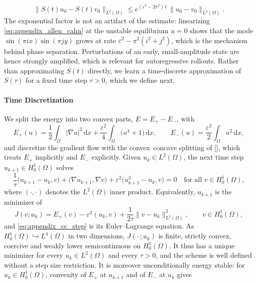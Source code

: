 \documentclass{article} %
\begin{document}
\begin{equation}\label{eq:appendix_ac_stability}
   \|S(t)u_0 - S(t)v_0\|_{L^2(\Omega)} \leq e^{(\varepsilon^2 - 2\pi^2)\,t}\,\|u_0 - v_0\|_{L^2(\Omega)}.
\end{equation}
The exponential factor is not an artifact of the estimate: linearizing \eqref{eq:appendix_allen_cahn} at the unstable equilibrium $u = 0$ shows that the mode $\sin(\pi i x)\sin(\pi j y)$ grows at rate $\varepsilon^2 - \pi^2(i^2 + j^2)$, which is the mechanism behind phase separation. Perturbations of an early, small-amplitude state are hence strongly amplified, which is relevant for autoregressive rollouts. Rather than approximating $S(t)$ directly, we learn a time-discrete approximation of $S(\tau)$ for a fixed time step $\tau > 0$, which we define next.

\paragraph{Time Discretization} We split the energy into two convex parts, $E = E_+ - E_-$, with
\begin{equation*}
   E_+(u) = \frac12\int_\Omega |\nabla u|^2\,\mathrm dx + \frac{\varepsilon^2}{4}\int_\Omega \big(u^4 + 1\big)\,\mathrm dx,
   \qquad
   E_-(u) = \frac{\varepsilon^2}{2}\int_\Omega u^2\,\mathrm dx,
\end{equation*}
and discretize the gradient flow with the convex--concave splitting of [], which treats $E_+$ implicitly and $E_-$ explicitly. Given $u_k \in L^2(\Omega)$, the next time step $u_{k+1}\in H^1_0(\Omega)$ solves
\begin{equation}\label{eq:appendix_cc_step}
   \frac1\tau\big(u_{k+1} - u_k, v\big) + \big(\nabla u_{k+1}, \nabla v\big) + \varepsilon^2\big(u_{k+1}^3 - u_k, v\big) = 0
   \quad \text{for all } v\in H^1_0(\Omega),
\end{equation}
where $(\cdot,\cdot)$ denotes the $L^2(\Omega)$ inner product. Equivalently, $u_{k+1}$ is the minimizer of
\begin{equation}\label{eq:appendix_cc_functional}
   J(v; u_k) = E_+(v) - \varepsilon^2 (u_k, v) + \frac{1}{2\tau}\|v - u_k\|^2_{L^2(\Omega)},
   \qquad v \in H^1_0(\Omega),
\end{equation}
and \eqref{eq:appendix_cc_step} is its Euler--Lagrange equation. As $H^1_0(\Omega)\hookrightarrow L^4(\Omega)$ in two dimensions, $J(\cdot\,; u_k)$ is finite, strictly convex, coercive and weakly lower semicontinuous on $H^1_0(\Omega)$. It thus has a unique minimizer for every $u_k\in L^2(\Omega)$ and every $\tau > 0$, and the scheme is well defined without a step size restriction. It is moreover unconditionally energy stable: for $u_k\in H^1_0(\Omega)$, convexity of $E_+$ at $u_{k+1}$ and of $E_-$ at $u_k$ gives
\end{document}
